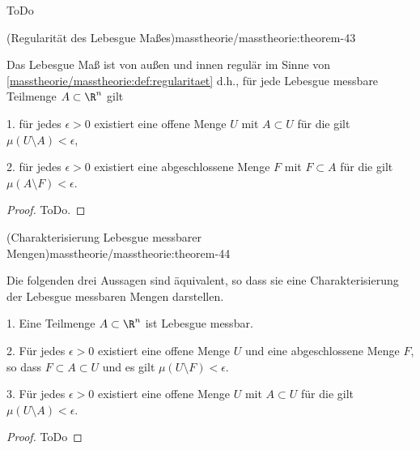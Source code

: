 \documentclass[letterpaper,10pt,german]{jupyterBook}
\begin{document}
\begin{emphBox}{}{}
\par
ToDo
\end{emphBox}
\begin{theorem}{(Regularität des Lebesgue Maßes)}{masstheorie/masstheorie:theorem-43}



\par
Das Lebesgue Maß ist von außen und innen regulär im Sinne von \cref{masstheorie/masstheorie:def:regularitaet}  d.h., für jede Lebesgue messbare Teilmenge \(A \subset \R^n\) gilt

\par
1. für jedes \(\epsilon > 0\) existiert eine offene Menge \(U\) mit \(A \subset U\) für die gilt \(\mu(U \setminus A) < \epsilon\),

\par
2. für jedes \(\epsilon > 0\) existiert eine abgeschlossene Menge \(F\) mit \(F \subset A\) für die gilt \(\mu(A \setminus F) < \epsilon\).
\end{theorem}

\begin{proof}
 ToDo.
\end{proof}
\begin{theorem}{(Charakterisierung Lebesgue messbarer Mengen)}{masstheorie/masstheorie:theorem-44}



\par
Die folgenden drei Aussagen sind äquivalent, so dass sie eine Charakterisierung der Lebesgue messbaren Mengen darstellen.

\par
1. Eine Teilmenge \(A \subset \R^n\) ist Lebesgue messbar.

\par
2. Für jedes \(\epsilon > 0\) existiert eine offene Menge \(U\) und eine abgeschlossene Menge \(F\), so dass \(F \subset A \subset U\) und es gilt \(\mu(U \setminus F) < \epsilon\).

\par
3. Für jedes \(\epsilon > 0\) existiert eine offene Menge \(U\) mit \(A \subset U\) für die gilt \(\mu(U \setminus A) < \epsilon\).
\end{theorem}

\begin{proof}
 ToDo
\end{proof}
\end{document}

